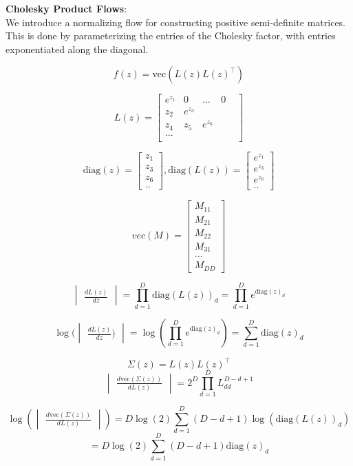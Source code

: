 \documentclass[11pt]{article}
\begin{document}
\textbf{Cholesky Product Flows}: \\
We introduce a normalizing flow for constructing positive semi-definite matrices.  This is done by parameterizing the entries of the Cholesky factor, with entries exponentiated along the diagonal.
 
\[ f(z) = \text{vec}(L(z)L(z)^\top) \]

\[L(z) = \begin{bmatrix} e^{z_1} & 0 & ... &  0 \\ z_2 & e^{z_3} &  & \\ z_4 & z_5 & e^{z_6} &  & \\ ... & & & \\ \end{bmatrix}\]

\[\text{diag}(z) = \begin{bmatrix} z_1 \\ z_3 \\ z_6 \\ .. \end{bmatrix}, \text{diag}(L(z)) = \begin{bmatrix} e^{z_1} \\ e^{z_3} \\ e^{z_6} \\ .. \end{bmatrix} \]

\[vec(M) = \begin{bmatrix} M_{11} \\ M_{21} \\ M_{22} \\ M_{31} \\ ... \\ M_{DD} \end{bmatrix} \]

\[\begin{vmatrix} \frac{d L(z)}{dz} \end{vmatrix} = \prod_{d=1}^D \text{diag}(L(z))_d = \prod_{d=1}^D e^{\text{diag}(z)_d} \]

\[\log(\begin{vmatrix} \frac{d L(z)}{dz}) \end{vmatrix} = \log(\prod_{d=1}^D e^{\text{diag}(z)_d}) = \sum_{d=1}^D \text{diag}(z)_d \]

\[ \Sigma(z) = L(z) L(z)^\top \]
\[\begin{vmatrix} \frac{d \text{vec}(\Sigma(z))}{d L(z)} \end{vmatrix} = 2^D \prod_{d=1}^D L_{dd}^{D-d+1} \]

\[\log (\begin{vmatrix} \frac{d \text{vec}(\Sigma(z))}{d L(z)} \end{vmatrix}) = D \log(2) \sum_{d=1}^D (D-d+1) \log(\text{diag}(L(z))_d) \]
\[ =  D \log(2) \sum_{d=1}^D (D-d+1) \text{diag}(z)_d \]
\end{document}
